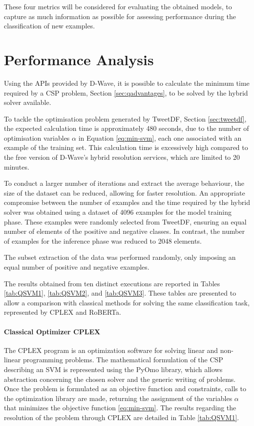 These four metrics will be considered for evaluating the obtained models, to capture as much information as possible for assessing performance during the classification of new examples.

\section{Performance Analysis}\label{sec:qsvm-performance}

Using the APIs provided by D-Wave, it is possible to calculate the minimum time required by a CSP problem, Section \ref{sec:qadvantages}, to be solved by the hybrid solver available.

To tackle the optimisation problem generated by TweetDF, Section \ref{sec:tweetdf}, the expected calculation time is approximately 480 seconds, due to the number of optimisation variables $\alpha$ in Equation \eqref{eq:min-svm}, each one associated with an example of the training set. 
This calculation time is excessively high compared to the free version of D-Wave's hybrid resolution services, which are limited to 20 minutes.

To conduct a larger number of iterations and extract the average behaviour, the size of the dataset can be reduced, allowing for faster resolution. 
An appropriate compromise between the number of examples and the time required by the hybrid solver was obtained using a dataset of 4096 examples for the model training phase. 
These examples were randomly selected from TweetDF, ensuring an equal number of elements of the positive and negative classes. 
In contrast, the number of examples for the inference phase was reduced to 2048 elements.

The subset extraction of the data was performed randomly, only imposing an equal number of positive and negative examples.

The results obtained from ten distinct executions are reported in Tables \ref{tab:QSVM1}, \ref{tab:QSVM2}, and \ref{tab:QSVM3}. These tables are presented to allow a comparison with classical methods for solving the same classification task, represented by CPLEX and RoBERTa.

\paragraph{Classical Optimizer CPLEX} The CPLEX program\cite{cplex} is an optimization software for solving linear and non-linear programming problems. The mathematical formulation of the CSP describing an SVM is represented using the PyOmo library, which allows abstraction concerning the chosen solver and the generic writing of problems. Once the problem is formulated as an objective function and constraints, calls to the optimization library are made, returning the assignment of the variables $\alpha$ that minimizes the objective function \eqref{eq:min-svm}. The results regarding the resolution of the problem through CPLEX are detailed in Table \ref{tab:QSVM1}.

